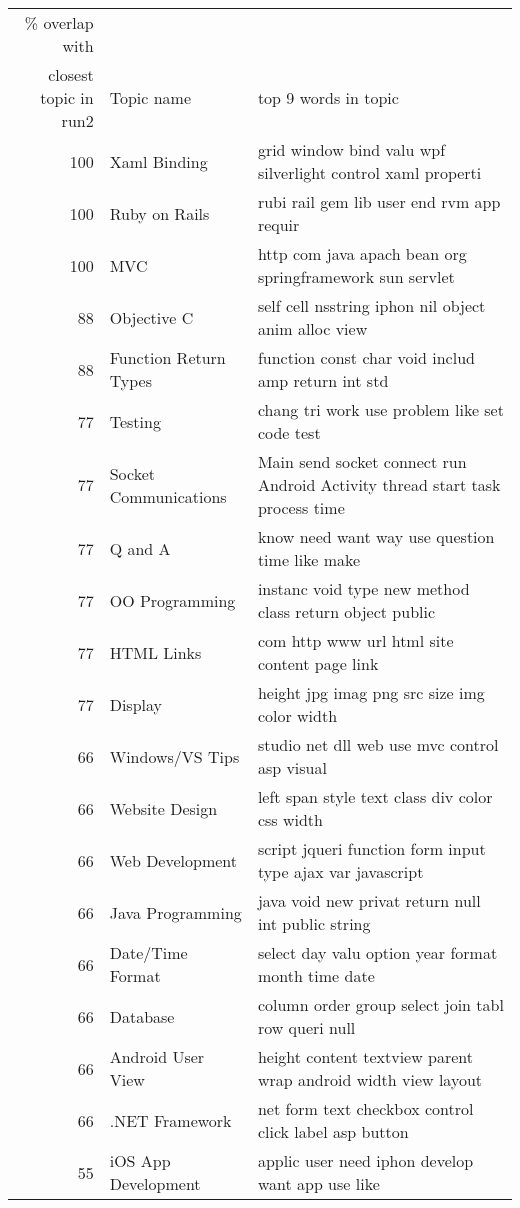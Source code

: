 \begin{figure*}[!t]
\renewcommand{\baselinestretch}{0.75}
\begin{center}
\footnotesize
\begin{tabular}{r|l|l}
\% overlap with & &\\
closest topic in run2  & Topic name & top 9 words in topic\\\hline
100 &Xaml Binding & grid window bind valu wpf silverlight control xaml properti\\
100 & Ruby on Rails & rubi rail gem lib user end rvm app requir  \\ 
100 &MVC & http com java apach bean org springframework sun servlet\\
88 &Objective C & self cell nsstring iphon nil object anim alloc view\\
88 &Function Return Types & function const char void includ amp return int std\\
77 &Testing & chang tri work use problem like set code test\\
77 &Socket Communications & Main send socket connect run Android Activity thread start task process time\\
77 &Q and A & know need want way use question time like make\\
77 &OO Programming & instanc void type new method class return object public\\
77 &HTML Links & com http www url html site content page link\\
77 &Display & height jpg imag png src size img color width\\
66 &Windows/VS Tips & studio net dll web use mvc control asp visual\\
66 &Website Design & left span style text class div color css width\\
66 &Web Development & script jqueri function form input type ajax var javascript\\
66 &Java Programming & java void new privat return null int public string\\
66 &Date/Time Format & select day valu option year format month time date\\
66 &Database & column order group select join tabl row queri null\\
66 &Android User View & height content textview parent wrap android width view layout\\
66 &.NET Framework & net form text checkbox control click label asp button\\
55 &iOS App Development & applic user need iphon develop want app use like\\

\end{tabular}
\end{center}
\end{figure*}
